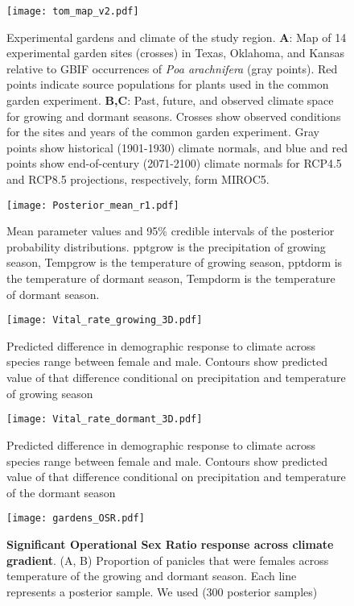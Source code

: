 \documentclass[9pt,twoside,lineno]{pnas-new}
\begin{document}
\begin{figure}
\centering
\texttt{[image: tom\_map\_v2.pdf]}
\caption{ Experimental gardens and climate of the study region. 
  	\textbf{A}: Map of 14 experimental garden sites (crosses) in Texas, Oklahoma, and Kansas relative to GBIF occurrences of \textit{Poa arachnifera} (gray points). Red points indicate source populations for plants used in the common garden experiment. 
  	\textbf{B,C}: Past, future, and observed climate space for growing and dormant seasons. Crosses show observed conditions for the sites and years of the common garden experiment. Gray points show historical (1901-1930) climate normals, and blue and red points show end-of-century (2071-2100) climate normals for RCP4.5 and RCP8.5 projections, respectively, form MIROC5.
}
\label{Sup:climate_variation1}
\end{figure}
\clearpage

\begin{figure}
\centering
\texttt{[image: Posterior\_mean\_r1.pdf]}
\caption{Mean parameter values and 95\% credible intervals of the posterior probability distributions. 
		pptgrow is  the precipitation of growing season,
		Tempgrow is the temperature of growing season,
		pptdorm is the temperature of dormant season,
		Tempdorm is the temperature of dormant season.}
\label{Sup:Posterior}
\end{figure}
\clearpage

\begin{figure}
\centering
\texttt{[image: Vital\_rate\_growing\_3D.pdf]}
\caption{ Predicted difference in demographic response to climate across species range between female and male. Contours show predicted value of that difference conditional on precipitation and temperature of  growing season }
\label{Sup:vt_3D_grow}
\end{figure}
\clearpage

\begin{figure}
\centering
\texttt{[image: Vital\_rate\_dormant\_3D.pdf]}
\caption{ Predicted difference in demographic response to climate across species range between female and male. Contours show predicted value of that difference conditional on precipitation and temperature of the dormant  season }
\label{Sup:vt_3D_dorm}
\end{figure}
\clearpage

\begin{figure}
\centering
\texttt{[image: gardens\_OSR.pdf]}
\caption{\textbf{Significant Operational Sex Ratio response across climate gradient}.
			(A, B) Proportion of panicles that were females across  temperature of the growing and dormant season.
			Each line represents a  posterior sample. We used (300 posterior samples)  }
\label{Sup:gardens_OSR}
\end{figure}
\clearpage
\end{document}
